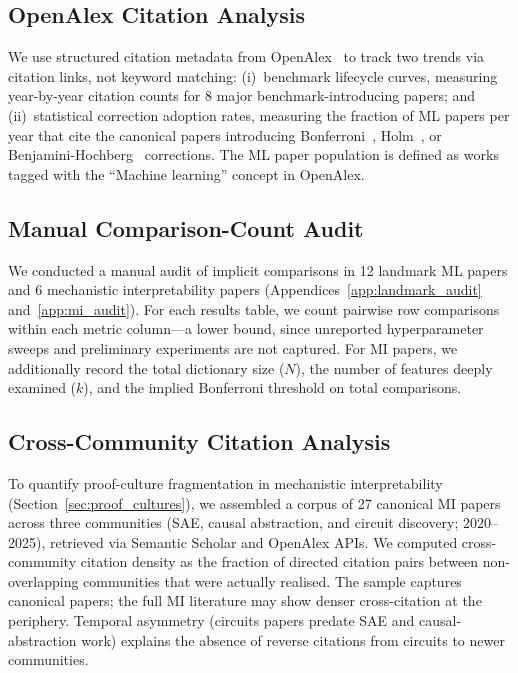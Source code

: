 \documentclass{article}
\begin{document}
\subsection{OpenAlex Citation Analysis}

We use structured citation metadata from OpenAlex~\citep{priem_openalex_2022} to track two trends via citation links, not keyword matching: (i)~benchmark lifecycle curves, measuring year-by-year citation counts for 8 major benchmark-introducing papers; and (ii)~statistical correction adoption rates, measuring the fraction of ML papers per year that cite the canonical papers introducing Bonferroni~\citep{dunn_1961}, Holm~\citep{holm_1979}, or Benjamini-Hochberg~\citep{benjamini_hochberg_1995} corrections. The ML paper population is defined as works tagged with the ``Machine learning'' concept in OpenAlex.

\subsection{Manual Comparison-Count Audit}

We conducted a manual audit of implicit comparisons in 12 landmark ML papers and 6 mechanistic interpretability papers (Appendices~\ref{app:landmark_audit} and~\ref{app:mi_audit}). For each results table, we count pairwise row comparisons within each metric column---a lower bound, since unreported hyperparameter sweeps and preliminary experiments are not captured. For MI papers, we additionally record the total dictionary size ($N$), the number of features deeply examined ($k$), and the implied Bonferroni threshold on total comparisons.

\subsection{Cross-Community Citation Analysis}

To quantify proof-culture fragmentation in mechanistic interpretability (Section~\ref{sec:proof_cultures}), we assembled a corpus of 27 canonical MI papers across three communities (SAE, causal abstraction, and circuit discovery; 2020--2025), retrieved via Semantic Scholar and OpenAlex APIs. We computed cross-community citation density as the fraction of directed citation pairs between non-overlapping communities that were actually realised. The sample captures canonical papers; the full MI literature may show denser cross-citation at the periphery. Temporal asymmetry (circuits papers predate SAE and causal-abstraction work) explains the absence of reverse citations from circuits to newer communities.
\end{document}

